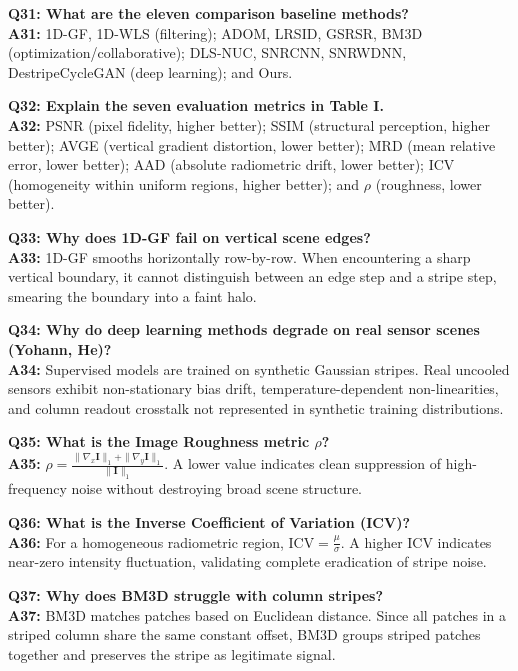 \documentclass[10pt,conference]{IEEEtran}
\begin{document}
\noindent\textbf{Q31: What are the eleven comparison baseline methods?}\\
\textbf{A31:} 1D-GF, 1D-WLS (filtering); ADOM, LRSID, GSRSR, BM3D (optimization/collaborative); DLS-NUC, SNRCNN, SNRWDNN, DestripeCycleGAN (deep learning); and Ours.

\vspace{0.4em}\noindent\textbf{Q32: Explain the seven evaluation metrics in Table I.}\\
\textbf{A32:} PSNR (pixel fidelity, higher better); SSIM (structural perception, higher better); AVGE (vertical gradient distortion, lower better); MRD (mean relative error, lower better); AAD (absolute radiometric drift, lower better); ICV (homogeneity within uniform regions, higher better); and $\rho$ (roughness, lower better).

\vspace{0.4em}\noindent\textbf{Q33: Why does 1D-GF fail on vertical scene edges?}\\
\textbf{A33:} 1D-GF smooths horizontally row-by-row. When encountering a sharp vertical boundary, it cannot distinguish between an edge step and a stripe step, smearing the boundary into a faint halo.

\vspace{0.4em}\noindent\textbf{Q34: Why do deep learning methods degrade on real sensor scenes (Yohann, He)?}\\
\textbf{A34:} Supervised models are trained on synthetic Gaussian stripes. Real uncooled sensors exhibit non-stationary bias drift, temperature-dependent non-linearities, and column readout crosstalk not represented in synthetic training distributions.

\vspace{0.4em}\noindent\textbf{Q35: What is the Image Roughness metric $\rho$?}\\
\textbf{A35:} $\rho = \frac{\|\nabla_x \mathbf{I}\|_1 + \|\nabla_y \mathbf{I}\|_1}{\|\mathbf{I}\|_1}$. A lower value indicates clean suppression of high-frequency noise without destroying broad scene structure.

\vspace{0.4em}\noindent\textbf{Q36: What is the Inverse Coefficient of Variation (ICV)?}\\
\textbf{A36:} For a homogeneous radiometric region, $\text{ICV} = \frac{\mu}{\sigma}$. A higher ICV indicates near-zero intensity fluctuation, validating complete eradication of stripe noise.

\vspace{0.4em}\noindent\textbf{Q37: Why does BM3D struggle with column stripes?}\\
\textbf{A37:} BM3D matches patches based on Euclidean distance. Since all patches in a striped column share the same constant offset, BM3D groups striped patches together and preserves the stripe as legitimate signal.
\end{document}
